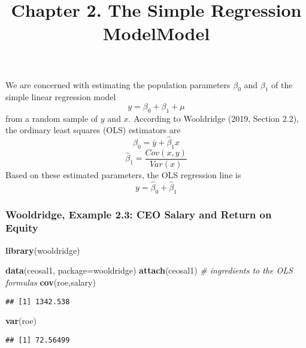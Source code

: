 \documentclass[
]{article}
\title{Chapter 2. The Simple Regression ModelModel}
\author{}
\date{\vspace{-2.5em}}
\newenvironment{Shaded}{\begin{snugshade}}{\end{snugshade}}
\newcommand{\AttributeTok}[1]{\textcolor[rgb]{0.13,0.29,0.53}{#1}}
\newcommand{\CommentTok}[1]{\textcolor[rgb]{0.56,0.35,0.01}{\textit{#1}}}
\newcommand{\FunctionTok}[1]{\textcolor[rgb]{0.13,0.29,0.53}{\textbf{#1}}}
\newcommand{\NormalTok}[1]{#1}
\newcommand{\StringTok}[1]{\textcolor[rgb]{0.31,0.60,0.02}{#1}}
\begin{document}
\maketitle

We are concerned with estimating the population parameters \(β_0\) and
\(β_1\) of the simple linear regression model \[
y = \beta_0 + \beta_1 + \mu
\] from a random sample of \(y\) and \(x\). According to Wooldridge
(2019, Section 2.2), the ordinary least squares (OLS) estimators are \[
\hat{\beta}_0 = \bar{y} + \hat{\beta}_1x
\] \[
\hat{\beta}_1 = \frac{Cov(x, y)}{Var(x)}
\] Based on these estimated parameters, the OLS regression line is \[
y = \hat{\beta}_0 + \hat{\beta}_1
\]

\hypertarget{wooldridge-example-2.3-ceo-salary-and-return-on-equity}{%
\subsubsection{Wooldridge, Example 2.3: CEO Salary and Return on
Equity}\label{wooldridge-example-2.3-ceo-salary-and-return-on-equity}}

\begin{Shaded}
\begin{Highlighting}[]
\FunctionTok{library}\NormalTok{(wooldridge)}
\end{Highlighting}
\end{Shaded}

\begin{Shaded}
\begin{Highlighting}[]
\FunctionTok{data}\NormalTok{(ceosal1, }\AttributeTok{package=}\StringTok{\textquotesingle{}wooldridge\textquotesingle{}}\NormalTok{)}
\FunctionTok{attach}\NormalTok{(ceosal1)}
\CommentTok{\# ingredients to the OLS formulas}
\FunctionTok{cov}\NormalTok{(roe,salary)}
\end{Highlighting}
\end{Shaded}

\begin{verbatim}
## [1] 1342.538
\end{verbatim}

\begin{Shaded}
\begin{Highlighting}[]
\FunctionTok{var}\NormalTok{(roe)}
\end{Highlighting}
\end{Shaded}

\begin{verbatim}
## [1] 72.56499
\end{verbatim}
\end{document}

